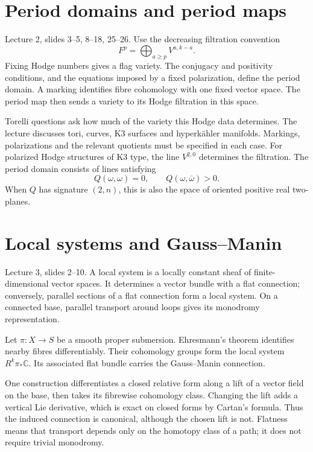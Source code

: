 \section{Period domains and period maps}
\label{section-period-maps}

Lecture 2, slides 3--5, 8--18, 25--26.
Use the decreasing filtration convention
$$
F^p=\bigoplus_{a\geq p}V^{a,k-a}.
$$
Fixing Hodge numbers gives a flag variety.
The conjugacy and positivity conditions,
and the equations imposed by a fixed
polarization, define the period domain.
A marking identifies fibre cohomology with
one fixed vector space. The period map
then sends a variety to its Hodge
filtration in this space.

Torelli questions ask how much of the
variety this Hodge data determines.
The lecture discusses tori, curves, K3
surfaces and hyperk\"ahler manifolds.
Markings, polarizations and the relevant
quotients must be specified in each case.
For polarized Hodge structures of K3 type,
the line $V^{2,0}$ determines the filtration.
The period domain consists of lines
satisfying
$$
Q(\omega,\omega)=0,
\qquad Q(\omega,\overline\omega)>0.
$$
When $Q$ has signature $(2,n)$, this is
also the space of oriented positive
real two-planes.

\section{Local systems and Gauss--Manin}
\label{section-gauss-manin}

Lecture 3, slides 2--10.
A local system is a locally constant
sheaf of finite-dimensional vector spaces.
It determines a vector bundle with a flat
connection; conversely, parallel sections
of a flat connection form a local system.
On a connected base, parallel transport
around loops gives its monodromy
representation.

Let $\pi:X\longrightarrow S$ be a smooth
proper submersion. Ehresmann's theorem
identifies nearby fibres differentiably.
Their cohomology groups form the local
system $R^k\pi_*\mathbb C$. Its associated
flat bundle carries the Gauss--Manin
connection.

One construction differentiates a closed
relative form along a lift of a vector
field on the base, then takes its fibrewise
cohomology class. Changing the lift adds
a vertical Lie derivative, which is exact
on closed forms by Cartan's formula.
Thus the induced connection is canonical,
although the chosen lift is not.
Flatness means that transport depends
only on the homotopy class of a path;
it does not require trivial monodromy.


